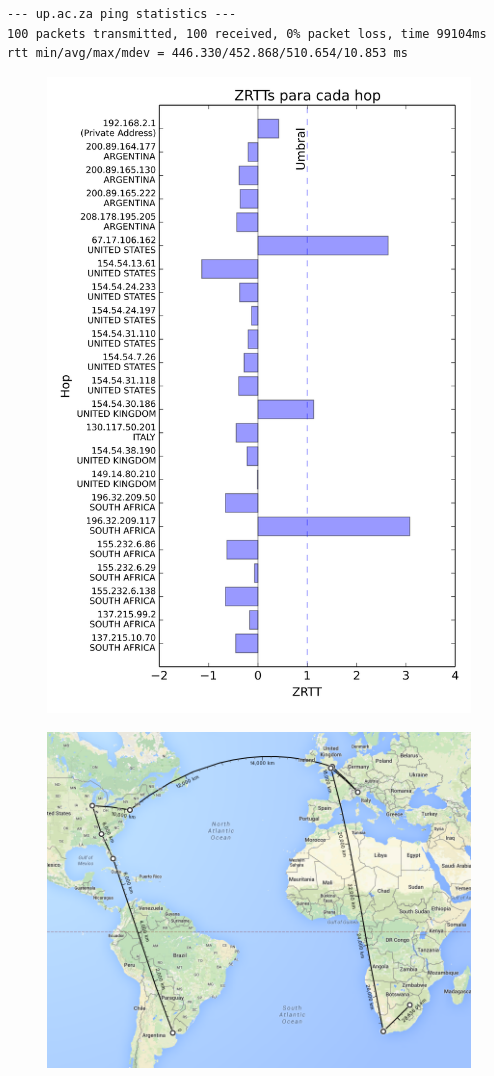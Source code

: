\begin{verbatim}
--- up.ac.za ping statistics ---
100 packets transmitted, 100 received, 0% packet loss, time 99104ms
rtt min/avg/max/mdev = 446.330/452.868/510.654/10.853 ms
\end{verbatim}

\begin{figure}[htp]
 \centering
 \includegraphics[scale=0.5]{imgs/pretoria.png}
\end{figure}

\begin{figure}[htp]
 \centering
  \includegraphics[width=5in]{imgs/maps/pretoria.png}
\end{figure}
